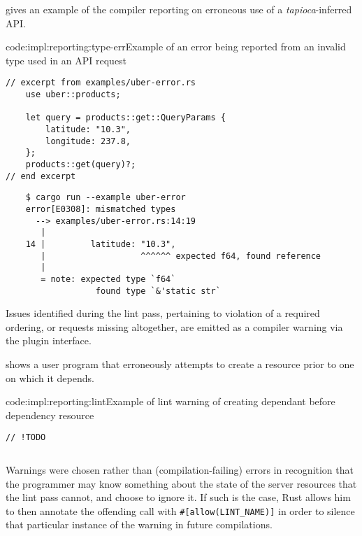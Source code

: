  gives an example of the compiler reporting on erroneous use of a \emph{tapioca}-inferred API.

\begin{codelisting}{code:impl:reporting:type-err}{Example of an error being reported from an invalid type used in an API request}
\begin{verbatim}
// excerpt from examples/uber-error.rs
    use uber::products;
    
    let query = products::get::QueryParams {
        latitude: "10.3",
        longitude: 237.8,
    };
    products::get(query)?;
// end excerpt
\end{verbatim}
\begin{verbatim}
    $ cargo run --example uber-error
    error[E0308]: mismatched types
      --> examples/uber-error.rs:14:19
       |
    14 |         latitude: "10.3",
       |                   ^^^^^^ expected f64, found reference
       |
       = note: expected type `f64`
                  found type `&'static str`
\end{verbatim}
\end{codelisting}

Issues identified during the lint pass, pertaining to violation of a required ordering, or requests missing altogether, are emitted as a compiler warning via the plugin interface. 

 shows a user program that erroneously attempts to create a resource prior to one on which it depends.

\begin{codelisting}{code:impl:reporting:lint}{Example of lint warning of creating dependant before dependency resource}
\begin{verbatim}
// !TODO
\end{verbatim}
\begin{verbatim}
\end{verbatim}
\end{codelisting}

Warnings were chosen rather than (compilation-failing) errors in recognition that the programmer may know something about the state of the server resources that the lint pass cannot, and choose to ignore it. If such is the case, Rust allows him to then annotate the offending call with \texttt{#[allow(LINT_NAME)]} in order to silence that particular instance of the warning in future compilations.
